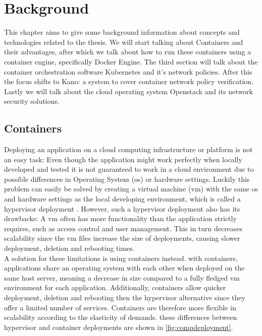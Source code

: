\chapter{Background}                                 \label{ch:background}
This chapter aims to give some background information about concepts and technologies related to the thesis.
We will start talking about Containers and their advantages, after which we talk about how to run these containers using a container engine, specifically Docker Engine. The third section will talk about the container orchestration software Kubernetes and it's network policies. After this the focus shifts to Kano: a system to cover container network policy verification. Lastly we will talk about the cloud operating system Openstack and its network security solutions.


\section{Containers}
Deploying an application on a cloud computing infrastructure or platform is not an easy task: Even though the application might work perfectly when locally developed and tested it is not guaranteed to work in a cloud environment due to possible differences in Operating System (\acrshort{os}) or hardware settings. Luckily this problem can easily be solved by creating a virtual machine (\acrshort{vm}) with the same \acrshort{os} and hardware settings as the local developing environment, which is called a hypervisor deployment \cite{Bernstein2014}. However, such a hypervisor deployment also has its drawbacks: A \acrshort{vm} often has more functionality than the application strictly requires, such as access control and user management. This in turn decreases scalability since the \acrshort{vm} files increase the size of deployments, causing slower deployment, deletion and rebooting times.
\\[10pt]

A solution for these limitations is using containers instead. with containers, applications share an operating system with each other when deployed on the same host server, meaning a decrease in size compared to a fully fledged \acrshort{vm} environment for each application. Additionally, containers allow quicker deployment, deletion and rebooting then the hypervisor alternative since they offer a limited number of services. Containers are therefore more flexible in scalability according to the elasticity of demands.  these differences between hypervisor and container deployments are shown in \autoref{fig:compdeployment}. 
\\[10pt]

